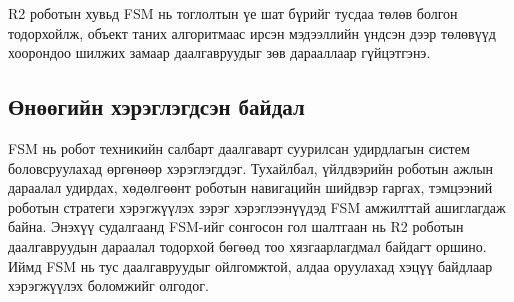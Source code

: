 R2 роботын хувьд FSM нь тоглолтын үе шат бүрийг тусдаа төлөв болгон тодорхойлж, объект таних алгоритмаас ирсэн мэдээллийн үндсэн дээр төлөвүүд хоорондоо шилжих замаар даалгавруудыг зөв дарааллаар гүйцэтгэнэ.

\subsection{Өнөөгийн хэрэглэгдсэн байдал}

FSM нь робот техникийн салбарт даалгаварт суурилсан удирдлагын систем боловсруулахад өргөнөөр хэрэглэгддэг. Тухайлбал, үйлдвэрийн роботын ажлын дараалал удирдах, хөдөлгөөнт роботын навигацийн шийдвэр гаргах, тэмцээний роботын стратеги хэрэгжүүлэх зэрэг хэрэглээнүүдэд FSM амжилттай ашиглагдаж байна. Энэхүү судалгаанд FSM-ийг сонгосон гол шалтгаан нь R2 роботын даалгавруудын дараалал тодорхой бөгөөд тоо хязгаарлагдмал байдагт оршино. Иймд FSM нь тус даалгавруудыг ойлгомжтой, алдаа оруулахад хэцүү байдлаар хэрэгжүүлэх боломжийг олгодог.
